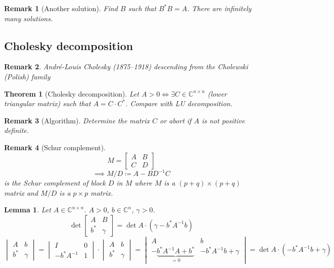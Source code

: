 \documentclass{article}
\newtheorem{theorem}{Theorem}  \numberwithin{theorem}{section}
\newtheorem{lemma}{Lemma}  \numberwithin{lemma}{section}
\newtheorem{remark}{Remark}  \numberwithin{remark}{section}
\begin{document}
\begin{remark}[Another solution]
  Find $B$ such that $B^* B = A$. There are infinitely many solutions.
\end{remark}

\subsection{Cholesky decomposition}

\begin{remark}
  Andr\'e-Louis Cholesky (1875--1918) descending from the Cholewski (Polish) family
\end{remark}

\begin{theorem}[Cholesky decomposition] %
  Let $A > 0 \iff \exists C \in \mathbb C^{n \times n}$ (lower triangular matrix) such that $A = C \cdot C^*$.
  Compare with LU decomposition.
\end{theorem}

\begin{remark}[Algorithm]
  Determine the matrix $C$ or abort if $A$ is not positive definite.
\end{remark}

\begin{remark}[Schur complement]
  \[ M = \begin{bmatrix} A & B \\ C & D \end{bmatrix} \]
  \[ \implies M/D \coloneqq A - BD^{-1} C \]
  is the Schur complement of block $D$ in $M$ where $M$ is a $(p + q) \times (p + q)$ matrix and $M/D$ is a $p\times p$ matrix.
\end{remark}

\begin{lemma}
  Let $A \in \mathbb C^{n \times n}$. $A > 0$, $b \in \mathbb C^n$, $\gamma > 0$.
  \[ \det\left[\begin{array}{c|c}A & B \\ \hline b^* & \gamma \end{array}\right] = \det A \cdot (\gamma - b^* A^{-1} b)  \]
  \[
    \begin{vmatrix} A & b \\ b^* & \gamma \end{vmatrix}
    = \begin{vmatrix} I & 0 \\ -b^* A^{-1} & 1 \end{vmatrix} \cdot \begin{vmatrix} A & b \\ b^* & \gamma \end{vmatrix}
    = \begin{vmatrix} A & b \\ -\underbrace{b^* A^{-1} A + b^*}_{=0} & -b^* A^{-1} b + \gamma \end{vmatrix}
    = \det{A} \cdot (-b^* A^{-1} b + \gamma)
  \]
\end{lemma}
\end{document}
